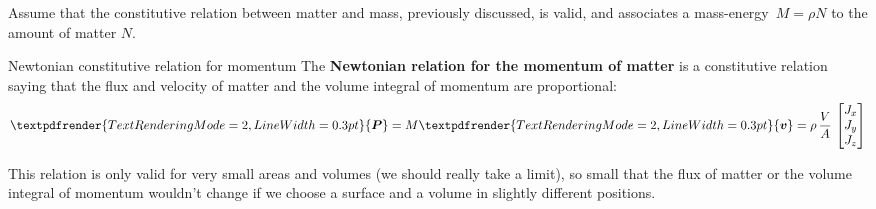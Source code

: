 \documentclass[a4paper,12pt,%
onecolumn,oneside,titlepage,%
british%
]{memoir}
\renewcommand*{\bm}[1]{\textpdfrender{TextRenderingMode=2,LineWidth=0.3pt}{\boldsymbol{#1}}}
\renewcommand*{\|}[1][]{\nonscript\:#1\vert\nonscript\:\mathopen{}}
\newcommand*{\sect}{\S}%
\newcommand*{\yv}{\bm{v}}
\newcommand*{\yN}{N}
\newcommand*{\yJ}{J}
\newcommand*{\yrho}{\rho}
\newcommand*{\yM}{M}%
\newcommand*{\yP}{\bm{P}}
\newcommand*{\masse}{mass-energy}
\begin{document}
% 
% 

Assume that the constitutive relation between matter and mass, previously discussed, is valid, and associates a \masse\ $\yM=\yrho\yN$ to the amount of matter $\yN$.

\begin{definition}{Newtonian constitutive relation for momentum}
The \textbf{Newtonian relation for the momentum of matter} is a constitutive relation saying that the flux and velocity of matter and the volume integral of momentum are proportional:
  \begin{equation}
    \label{eq:matter_momentum_Newton}
    \yP = \yM\yv = \yrho\, \frac{V}{A}\,
  \begin{bmatrix}
    J_{x}\\J_{y}\\J_{z}
  \end{bmatrix}
  \end{equation}
\end{definition}
This relation is only valid for very small areas and volumes (we should really take a limit), so small that the flux of matter or the volume integral of momentum wouldn't change if we choose a surface and a volume in slightly different positions.
\end{document}

